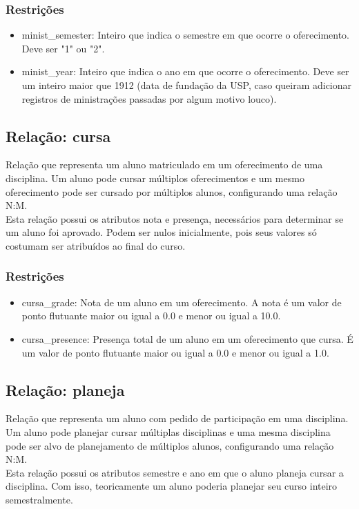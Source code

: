 \documentclass{article}
\begin{document}
        \subsubsection{Restrições}
            \begin{itemize}
                \item minist\_semester: Inteiro que indica o semestre em que ocorre o oferecimento. Deve ser "1" ou "2".
                \item minist\_year: Inteiro que indica o ano em que ocorre o oferecimento. Deve ser um inteiro maior que 1912 (data de fundação da USP, caso queiram adicionar registros de ministrações passadas por algum motivo louco).
            \end{itemize}
         
    \subsection{Relação: cursa}
        \quad Relação que representa um aluno matriculado em um oferecimento de uma disciplina. Um aluno pode cursar múltiplos oferecimentos e um mesmo oferecimento pode ser cursado por múltiplos alunos, configurando uma relação N:M. \\
        \quad Esta relação possui os atributos nota e presença, necessários para determinar se um aluno foi aprovado. Podem ser nulos inicialmente, pois seus valores só costumam ser atribuídos ao final do curso.
        \subsubsection{Restrições}
            \begin{itemize}
                \item cursa\_grade: Nota de um aluno em um oferecimento. A nota é um valor de ponto flutuante maior ou igual a 0.0 e menor ou igual a 10.0.
                \item cursa\_presence: Presença total de um aluno em um oferecimento que cursa. É um valor de ponto flutuante maior ou igual a 0.0 e menor ou igual a 1.0.
             \end{itemize}

    \subsection{Relação: planeja}
        \quad Relação que representa um aluno com pedido de participação em uma disciplina. Um aluno pode planejar cursar múltiplas disciplinas e uma mesma disciplina pode ser alvo de planejamento de múltiplos alunos, configurando uma relação N:M. \\
        \quad Esta relação possui os atributos semestre e ano em que o aluno planeja cursar a disciplina. Com isso, teoricamente um aluno poderia planejar seu curso inteiro semestralmente.
\end{document}

